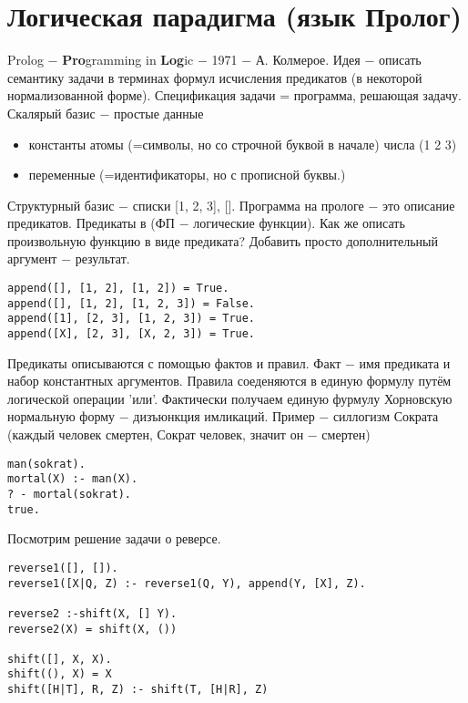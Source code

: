 \documentclass[a4paper, 12pt, titlepage, finall]{extreport}
\begin{document}
    \chapter{Логическая парадигма (язык Пролог)}
        Prolog $-$ \textbf{Pro}gramming in \textbf{Log}ic $-$ 1971 $-$ А. Колмерое.
        Идея $-$ описать семантику задачи в терминах формул исчисления предикатов (в некоторой нормализованной форме).
        Спецификация задачи = программа, решающая задачу.
        Скалярый базис $-$ простые данные
        \begin{itemize}
            \item константы
                \subitem атомы (=символы, но со строчной буквой в начале)
                \subitem числа (1 2 3)
            \item переменные (=идентификаторы, но с прописной буквы.)
        \end{itemize}
        Структурный базис $-$ списки [1, 2, 3], []. Программа на прологе $-$ это описание предикатов.
        Предикаты в (ФП $-$ логические функции). Как же описать произвольную функцию в виде предиката?
        Добавить просто дополнительный аргумент $-$ результат.
\begin{lstlisting}
append([], [1, 2], [1, 2]) = True.
append([], [1, 2], [1, 2, 3]) = False.
append([1], [2, 3], [1, 2, 3]) = True.
append([X], [2, 3], [X, 2, 3]) = True.
\end{lstlisting}
        Предикаты описываются с помощью фактов и правил. Факт $-$ имя предиката и набор константных аргументов.
        Правила соеденяются в единую формулу путём логической операции 'или'. Фактически получаем единую фурмулу Хорновскую нормальную форму $-$
        дизъюнкция имликаций.
        Пример $-$ силлогизм Сократа (каждый человек смертен, Сократ человек, значит он $-$ смертен)
\begin{lstlisting}
man(sokrat).
mortal(X) :- man(X).
? - mortal(sokrat).
true.
\end{lstlisting}
        Посмотрим решение задачи о реверсе.
\begin{lstlisting}
reverse1([], []).
reverse1([X|Q, Z) :- reverse1(Q, Y), append(Y, [X], Z).

reverse2 :-shift(X, [] Y).
reverse2(X) = shift(X, ())

shift([], X, X).
shift((), X) = X
shift([H|T], R, Z) :- shift(T, [H|R], Z)
\end{lstlisting}
\end{document}
